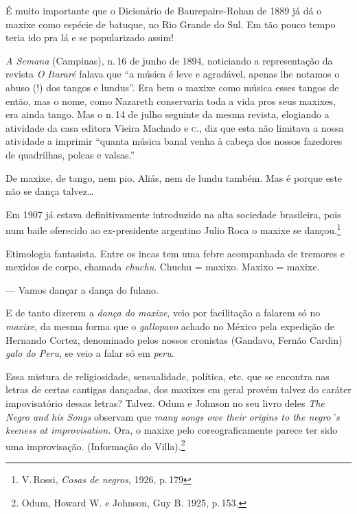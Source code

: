 É muito importante que o Dicionário de Baurepaire-Rohan de 1889 já dá o
maxixe como espécie de batuque, no Rio Grande do Sul. Em tão pouco tempo
teria ido pra lá e se popularizado assim! %

\textit{A Semana} (Campinas), n.\,16 de junho de 1894, noticiando a
representação da revista \textit{O Itararé} falava que ``a música é leve e
agradável, apenas lhe notamos o abuso (!) dos tangos e lundus''. Era bem
o maxixe como música esses tangos de então, mas o nome, como Nazareth
conservaria toda a vida pros seus maxixes, era ainda tango. Mas o n.\,14 de julho seguinte da mesma revista, elogiando a atividade da casa
editora Vieira Machado e \textsc{c}., diz que esta não limitava a nossa atividade
a imprimir ``quanta música banal venha à cabeça dos nossos fazedores de
quadrilhas, polcas e valsas.''

De maxixe, de tango, nem pio. Aliás, nem de lundu também. Mas é porque
este não se dança talvez\ldots{}%

Em 1907 já estava definitivamente introduzido na alta sociedade
brasileira, pois num baile oferecido ao ex-presidente argentino Julio
Roca o maxixe se dançou.\footnote{V.\,Rossi, \textit{Cosas de negros}, 1926, p.\,179}

Etimologia fantasista. Entre os incas tem uma febre acompanhada de
tremores e mexidos de corpo, chamada \textit{chuchu}. Chuchu = maxixo. Maxixo =
maxixe. %

\smallskip

--- Vamos dançar a dança do fulano.

\smallskip

E de tanto dizerem a \textit{dança do maxixe}, veio por facilitação a falarem
só no \textit{maxixe}, da mesma forma que o \textit{gallopavo} achado no México pela
expedição de Hernando Cortez, denominado pelos nossos cronistas
(Gandavo, Fernão Cardin) \textit{galo do Peru}, se veio a falar só em \textit{peru}. %

Essa mistura de religiosidade, sensualidade, política, etc. que se
encontra nas letras de certas cantigas dançadas, dos maxixes em geral
provém talvez do caráter impovisatório dessas letras? Talvez. Odum e
Johnson no seu livro deles \textit{The Negro and his Songs} observam que
\textit{many songs owe their origins to the negro´s keeness at improvisation.}
Ora, o maxixe pelo coreograficamente parece ter sido uma improvisação.
(Informação do Villa).\footnote{Odum, Howard W. e Johnson, Guy
B. 1925, p.\,153.} %

